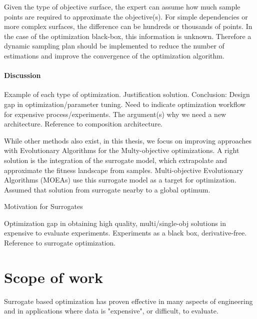         Given the type of objective surface, the expert can assume how much sample points are required to approximate the objective(s). For simple dependencies or more complex surfaces, the difference can be hundreds or thousands of points. In the case of the optimization black-box, this information is unknown. Therefore a dynamic sampling plan should be implemented to reduce the number of estimations and improve the convergence of the optimization algorithm.


        \paragraph{Discussion}


        Example of each type of optimization. Justification solution.
        Conclusion: Design gap in optimization/parameter tuning. 
        Need to indicate optimization workflow for expensive process/experiments. 
        The argument(s) why we need a new architecture. Reference to composition architecture.


        While other methods also exist, in this thesis, we focus on improving approaches with Evolutionary Algorithms for the Multy-objective optimizations. A right solution is the integration of the surrogate model, which extrapolate and approximate the fitness landscape from samples. Multi-objective Evolutionary Algorithms (MOEAs) use this surrogate model as a target for optimization. Assumed that solution from surrogate nearby to a global optimum.

        Motivation for Surrogates

        Optimization gap in obtaining high quality, multi/single-obj solutions in expensive to evaluate experiments.
        Experiments as a black box, derivative-free. Reference to surrogate optimization.




    \section{Scope of work}
        Surrogate based optimization has proven effective in many aspects of engineering and in applications where data is "expensive", or difficult, to evaluate.

